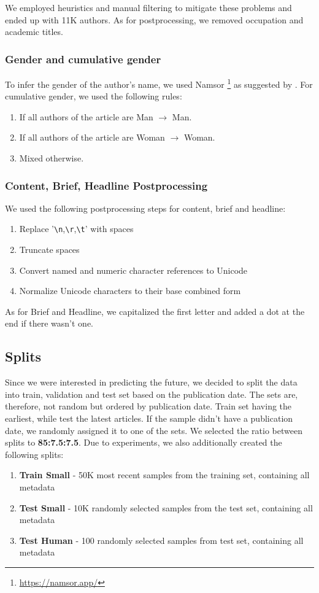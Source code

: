 We employed heuristics and manual filtering
to mitigate these problems and ended up with 11K authors.
As for postprocessing, we removed occupation and academic titles.

\subsubsection{Gender and cumulative gender}
\label{sec:gender}
To infer the gender of the author's name, we used Namsor \footnote{\url{https://namsor.app/}}
as suggested by \textcite{seboPerformanceGenderDetection}.
For cumulative gender, we used the following rules:
\begin{enumerate}
    \item If all authors of the article are Man $\rightarrow$ Man.
    \item If all authors of the article are Woman $\rightarrow$ Woman.
    \item Mixed otherwise.
\end{enumerate}

\subsubsection{Content, Brief, Headline Postprocessing}
We used the following postprocessing steps for content, brief and headline:
\begin{enumerate}
    \item Replace '\verb|\n|,\verb|\r|,\verb|\t|' with spaces
    \item Truncate spaces
    \item Convert named and numeric character references to Unicode
    \item Normalize Unicode characters to their base combined form
\end{enumerate}
As for Brief and Headline, we capitalized the first letter
and added a dot at the end if there wasn't one.

\subsection{Splits}
\label{sec:splits}
Since we were interested in predicting the future,
we decided to split the data into train, validation and test set based on the publication date.
The sets are, therefore, not random but ordered by publication date. Train set having the earliest, while test the latest articles.
If the sample didn't have a publication date, we randomly assigned it to one of the sets.
We selected the ratio between splits to \textbf{85:7.5:7.5}.
Due to experiments, we also additionally created the following splits:
\begin{enumerate}
    \item\label{enum:train-small} \textbf{Train Small} - 50K most recent samples from the training set, containing all metadata
    \item\label{enum:test-small} \textbf{Test Small} - 10K randomly selected samples from the test set, containing all metadata
    \item\label{enum:test-human} \textbf{Test Human} - 100 randomly selected samples from test set, containing all metadata
\end{enumerate}

